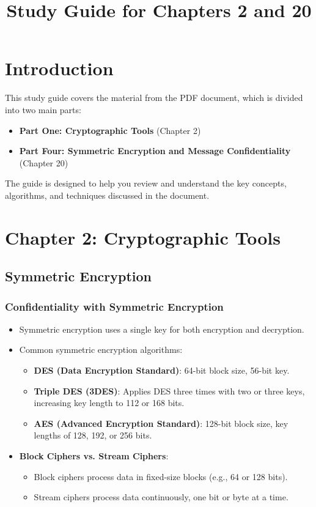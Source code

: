 \documentclass[12pt]{article}
\title{Study Guide for Chapters 2 and 20 }
\author{}
\date{}
\begin{document}
\maketitle

\section{Introduction}
This study guide covers the material from the PDF document, which is divided into two main parts:
\begin{itemize}
    \item \textbf{Part One: Cryptographic Tools} (Chapter 2)
    \item \textbf{Part Four: Symmetric Encryption and Message Confidentiality} (Chapter 20)
\end{itemize}

The guide is designed to help you review and understand the key concepts, algorithms, and techniques discussed in the document.

\section{Chapter 2: Cryptographic Tools}

\subsection{Symmetric Encryption}
\subsubsection{Confidentiality with Symmetric Encryption}
\begin{itemize}
    \item Symmetric encryption uses a single key for both encryption and decryption.
    \item Common symmetric encryption algorithms:
    \begin{itemize}
        \item \textbf{DES (Data Encryption Standard)}: 64-bit block size, 56-bit key.
        \item \textbf{Triple DES (3DES)}: Applies DES three times with two or three keys, increasing key length to 112 or 168 bits.
        \item \textbf{AES (Advanced Encryption Standard)}: 128-bit block size, key lengths of 128, 192, or 256 bits.
    \end{itemize}
    \item \textbf{Block Ciphers vs. Stream Ciphers}:
    \begin{itemize}
        \item Block ciphers process data in fixed-size blocks (e.g., 64 or 128 bits).
        \item Stream ciphers process data continuously, one bit or byte at a time.
    \end{itemize}
\end{itemize}
\end{document}
